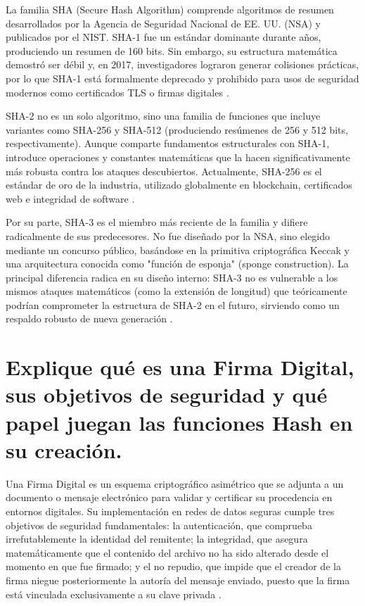 \documentclass[a4paper,12pt]{article}
\begin{document}
La familia SHA (Secure Hash Algorithm) comprende algoritmos de resumen desarrollados por la Agencia de Seguridad Nacional de EE. UU. (NSA) y publicados por el NIST. SHA-1 fue un estándar dominante durante años, produciendo un resumen de 160 bits. Sin embargo, su estructura matemática demostró ser débil y, en 2017, investigadores lograron generar colisiones prácticas, por lo que SHA-1 está formalmente deprecado y prohibido para usos de seguridad modernos como certificados TLS o firmas digitales \cite{stallings2017}.

SHA-2 no es un solo algoritmo, sino una familia de funciones que incluye variantes como SHA-256 y SHA-512 (produciendo resúmenes de 256 y 512 bits, respectivamente). Aunque comparte fundamentos estructurales con SHA-1, introduce operaciones y constantes matemáticas que la hacen significativamente más robusta contra los ataques descubiertos. Actualmente, SHA-256 es el estándar de oro de la industria, utilizado globalmente en blockchain, certificados web e integridad de software \cite{nist2015}.

Por su parte, SHA-3 es el miembro más reciente de la familia y difiere radicalmente de sus predecesores. No fue diseñado por la NSA, sino elegido mediante un concurso público, basándose en la primitiva criptográfica Keccak y una arquitectura conocida como "función de esponja" (sponge construction). La principal diferencia radica en su diseño interno: SHA-3 no es vulnerable a los mismos ataques matemáticos (como la extensión de longitud) que teóricamente podrían comprometer la estructura de SHA-2 en el futuro, sirviendo como un respaldo robusto de nueva generación \cite{nist2015}.

\section{Explique qué es una Firma Digital, sus objetivos de seguridad y qué papel juegan las funciones Hash en su creación.}

Una Firma Digital es un esquema criptográfico asimétrico que se adjunta a un documento o mensaje electrónico para validar y certificar su procedencia en entornos digitales. Su implementación en redes de datos seguras cumple tres objetivos de seguridad fundamentales: la autenticación, que comprueba irrefutablemente la identidad del remitente; la integridad, que asegura matemáticamente que el contenido del archivo no ha sido alterado desde el momento en que fue firmado; y el no repudio, que impide que el creador de la firma niegue posteriormente la autoría del mensaje enviado, puesto que la firma está vinculada exclusivamente a su clave privada \cite{ibm2023}.
\end{document}
